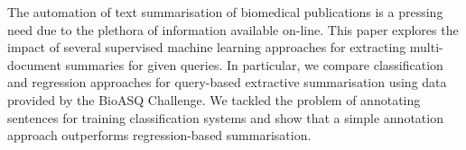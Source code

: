 The automation of text summarisation of biomedical publications is a pressing need due to the plethora of information available on-line. This paper explores the impact of several supervised machine learning approaches for extracting multi-document summaries for given queries. In particular, we compare classification and regression approaches for query-based extractive summarisation using data provided by the BioASQ Challenge. We tackled the problem of annotating sentences for training classification systems and show that a simple annotation approach outperforms regression-based summarisation.
